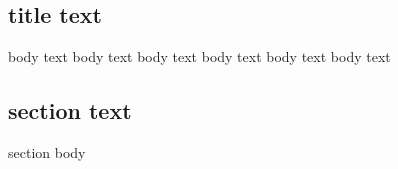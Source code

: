 \begin{myenv}
	\chapter{title text}
	 body text body text body text body text body text body text
	\section{section text}
	 section body
\end{myenv}
